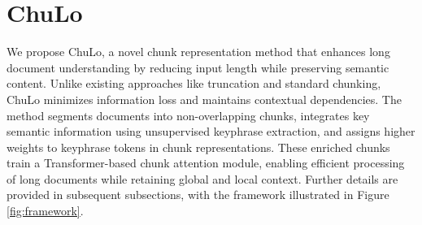 \documentclass[11pt]{article}
\begin{document}
\section{ChuLo}
We propose ChuLo, a novel chunk representation method that enhances long document understanding by reducing input length while preserving semantic content. Unlike existing approaches like truncation and standard chunking, ChuLo minimizes information loss and maintains contextual dependencies. The method segments documents into non-overlapping chunks, integrates key semantic information using unsupervised keyphrase extraction, and assigns higher weights to keyphrase tokens in chunk representations. These enriched chunks train a Transformer-based chunk attention module, enabling efficient processing of long documents while retaining global and local context. Further details are provided in subsequent subsections, with the framework illustrated in Figure \ref{fig:framework}.
\end{document}
